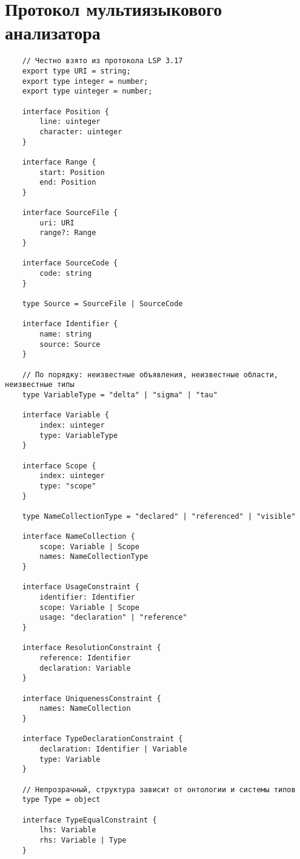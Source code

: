 \chapter{Протокол мультиязыкового анализатора}
\label{cha:appendix1}

\begin{verbatim}
    // Честно взято из протокола LSP 3.17
    export type URI = string;
    export type integer = number;
    export type uinteger = number;

    interface Position {
        line: uinteger
        character: uinteger
    }

    interface Range {
        start: Position
        end: Position
    }

    interface SourceFile {
        uri: URI
        range?: Range
    }

    interface SourceCode {
        code: string
    }

    type Source = SourceFile | SourceCode

    interface Identifier {
        name: string
        source: Source
    }

    // По порядку: неизвестные объявления, неизвестные области, неизвестные типы
    type VariableType = "delta" | "sigma" | "tau"

    interface Variable {
        index: uinteger
        type: VariableType
    }

    interface Scope {
        index: uinteger
        type: "scope"
    }

    type NameCollectionType = "declared" | "referenced" | "visible"

    interface NameCollection {
        scope: Variable | Scope
        names: NameCollectionType
    }

    interface UsageConstraint {
        identifier: Identifier
        scope: Variable | Scope
        usage: "declaration" | "reference"
    }

    interface ResolutionConstraint {
        reference: Identifier
        declaration: Variable
    }

    interface UniquenessConstraint {
        names: NameCollection
    }

    interface TypeDeclarationConstraint {
        declaration: Identifier | Variable
        type: Variable
    }

    // Непрозрачный, структура зависит от онтологии и системы типов
    type Type = object

    interface TypeEqualConstraint {
        lhs: Variable
        rhs: Variable | Type
    }


\end{verbatim}
